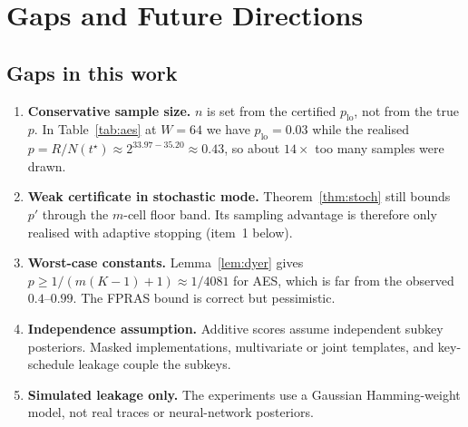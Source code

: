 \section{Gaps and Future Directions}\label{sec:future}

\subsection{Gaps in this work}
\begin{enumerate}[leftmargin=*]
\item \textbf{Conservative sample size.} $n$ is set from the certified $p_{\mathrm{lo}}$, not from the true $p$. In
      Table~\ref{tab:aes} at $W=64$ we have $p_{\mathrm{lo}}=0.03$ while the realised $p=R/N(t^\star)\approx2^{33.97-35.20}\approx0.43$, so about $14\times$ too many samples were drawn.
\item \textbf{Weak certificate in stochastic mode.} Theorem~\ref{thm:stoch} still bounds $p'$ through the $m$-cell floor band.
      Its sampling advantage is therefore only realised with adaptive stopping (item~1 below).
\item \textbf{Worst-case constants.} Lemma~\ref{lem:dyer} gives $p\ge1/(m(K-1)+1)\approx1/4081$ for AES, which is far from the
      observed $0.4$--$0.99$. The FPRAS bound is correct but pessimistic.
\item \textbf{Independence assumption.} Additive scores assume independent subkey posteriors. Masked implementations,
      multivariate or joint templates, and key-schedule leakage couple the subkeys.
\item \textbf{Simulated leakage only.} The experiments use a Gaussian Hamming-weight model, not real traces or neural-network posteriors.
\end{enumerate}


